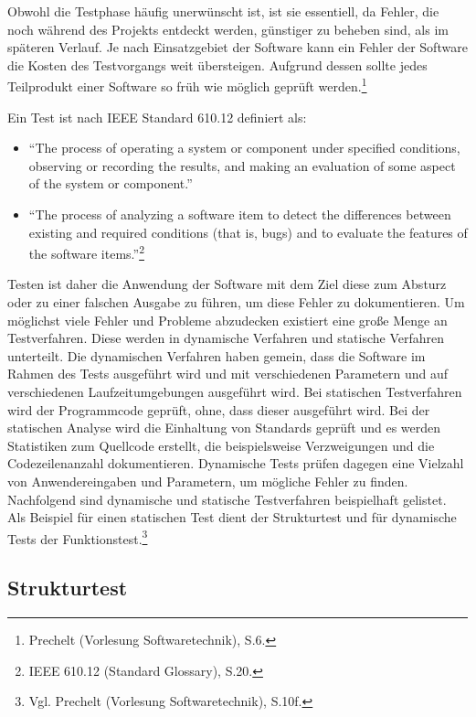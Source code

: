         Obwohl die Testphase häufig unerwünscht ist, ist sie essentiell, da Fehler, die noch während des Projekts entdeckt werden, günstiger zu beheben sind, als im späteren Verlauf. Je nach Einsatzgebiet der Software kann ein Fehler der Software die Kosten des Testvorgangs weit übersteigen. Aufgrund dessen sollte jedes Teilprodukt einer Software so früh wie möglich geprüft werden.\footnote{Prechelt (Vorlesung Softwaretechnik), S.6.}

        Ein Test ist nach IEEE Standard 610.12 definiert als:
        \begin{itemize}
            \item \enquote{The process of operating a system or component under specified conditions, observing or recording the results, and making an evaluation of some aspect of the system or component.}
            \item \enquote{The process of analyzing a software item to detect the differences between existing and required conditions (that is, bugs) and to evaluate the features of the software items.}\footnote{IEEE 610.12 (Standard Glossary), S.20.}
        \end{itemize}

        Testen ist daher die Anwendung der Software mit dem Ziel diese zum Absturz oder zu einer falschen Ausgabe zu führen, um diese Fehler zu dokumentieren. Um möglichst viele Fehler und Probleme abzudecken existiert eine große Menge an Testverfahren. Diese werden in dynamische Verfahren und statische Verfahren unterteilt. Die dynamischen Verfahren haben gemein, dass die Software im Rahmen des Tests ausgeführt wird und mit verschiedenen Parametern und auf verschiedenen Laufzeitumgebungen ausgeführt wird. Bei statischen Testverfahren wird der Programmcode geprüft, ohne, dass dieser ausgeführt wird. Bei der statischen Analyse wird die Einhaltung von Standards geprüft und es werden Statistiken zum Quellcode erstellt, die beispielsweise Verzweigungen und die Codezeilenanzahl dokumentieren. Dynamische Tests prüfen dagegen eine Vielzahl von Anwendereingaben und Parametern, um mögliche Fehler zu finden. Nachfolgend sind dynamische und statische Testverfahren beispielhaft gelistet. Als Beispiel für einen statischen Test dient der Strukturtest und für dynamische Tests der Funktionstest.\footnote{Vgl. Prechelt (Vorlesung Softwaretechnik), S.10f.}

        \subsection{Strukturtest}

